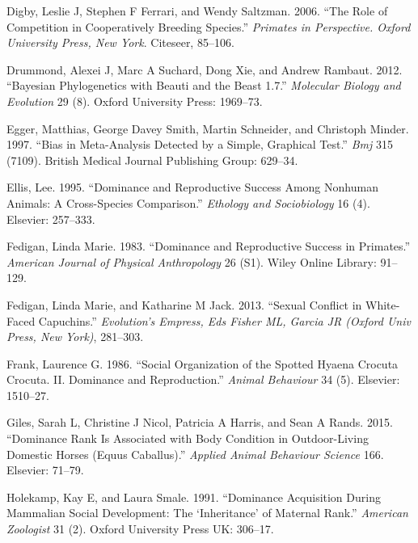 \documentclass[]{article}
\begin{document}
\leavevmode\hypertarget{ref-digby2006role}{}%
Digby, Leslie J, Stephen F Ferrari, and Wendy Saltzman. 2006. ``The Role
of Competition in Cooperatively Breeding Species.'' \emph{Primates in
Perspective. Oxford University Press, New York}. Citeseer, 85--106.

\leavevmode\hypertarget{ref-drummond2012bayesian}{}%
Drummond, Alexei J, Marc A Suchard, Dong Xie, and Andrew Rambaut. 2012.
``Bayesian Phylogenetics with Beauti and the Beast 1.7.''
\emph{Molecular Biology and Evolution} 29 (8). Oxford University Press:
1969--73.

\leavevmode\hypertarget{ref-egger1997bias}{}%
Egger, Matthias, George Davey Smith, Martin Schneider, and Christoph
Minder. 1997. ``Bias in Meta-Analysis Detected by a Simple, Graphical
Test.'' \emph{Bmj} 315 (7109). British Medical Journal Publishing Group:
629--34.

\leavevmode\hypertarget{ref-ellis1995dominance}{}%
Ellis, Lee. 1995. ``Dominance and Reproductive Success Among Nonhuman
Animals: A Cross-Species Comparison.'' \emph{Ethology and Sociobiology}
16 (4). Elsevier: 257--333.

\leavevmode\hypertarget{ref-fedigan1983dominance}{}%
Fedigan, Linda Marie. 1983. ``Dominance and Reproductive Success in
Primates.'' \emph{American Journal of Physical Anthropology} 26 (S1).
Wiley Online Library: 91--129.

\leavevmode\hypertarget{ref-fedigan2013sexual}{}%
Fedigan, Linda Marie, and Katharine M Jack. 2013. ``Sexual Conflict in
White-Faced Capuchins.'' \emph{Evolution's Empress, Eds Fisher ML,
Garcia JR (Oxford Univ Press, New York)}, 281--303.

\leavevmode\hypertarget{ref-frank1986social}{}%
Frank, Laurence G. 1986. ``Social Organization of the Spotted Hyaena
Crocuta Crocuta. II. Dominance and Reproduction.'' \emph{Animal
Behaviour} 34 (5). Elsevier: 1510--27.

\leavevmode\hypertarget{ref-giles2015dominance}{}%
Giles, Sarah L, Christine J Nicol, Patricia A Harris, and Sean A Rands.
2015. ``Dominance Rank Is Associated with Body Condition in
Outdoor-Living Domestic Horses (Equus Caballus).'' \emph{Applied Animal
Behaviour Science} 166. Elsevier: 71--79.

\leavevmode\hypertarget{ref-holekamp1991dominance}{}%
Holekamp, Kay E, and Laura Smale. 1991. ``Dominance Acquisition During
Mammalian Social Development: The `Inheritance' of Maternal Rank.''
\emph{American Zoologist} 31 (2). Oxford University Press UK: 306--17.
\end{document}
